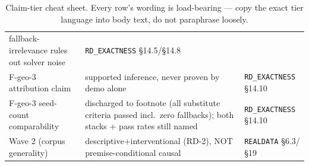 \begin{table}[h]
\begin{tabular}{p{3.7cm}p{5.2cm}p{3.2cm}}
  fallback-irrelevance rules out solver noise &
  \texttt{RD\_EXACTNESS} \S14.5/\S14.8 \\
F-geo-3 attribution claim & supported inference, never proven by demo
  alone & \texttt{RD\_EXACTNESS} \S14.10 \\
F-geo-3 seed-count comparability & discharged to footnote (all substitute
  criteria passed incl.\ zero fallbacks); both stacks + pass rates still
  named & \texttt{RD\_EXACTNESS} \S14.10 \\
Wave 2 (corpus generality) & descriptive+interventional (RD-2), NOT
  premise-conditional causal & \texttt{REALDATA} \S6.3/\S19 \\
\bottomrule
\end{tabular}
\caption{Claim-tier cheat sheet. Every row's wording is load-bearing ---
copy the exact tier language into body text, do not paraphrase loosely.}
\end{table}
